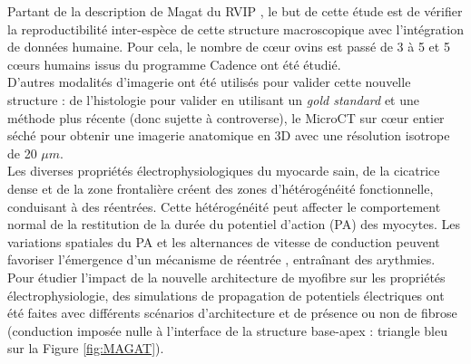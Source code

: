 Partant de la description de Magat du RVIP \cite{Magat2022},  le but de cette étude est de vérifier la reproductibilité inter-espèce de cette structure macroscopique avec l’intégration de données humaine. Pour cela, le nombre de cœur ovins est passé de 3 à 5 et 5 cœurs humains issus du programme Cadence ont été étudié. 
\\
D’autres modalités d’imagerie ont été utilisés pour valider cette nouvelle structure : de l’histologie pour valider en utilisant un \textit{gold standard} et une méthode plus récente (donc sujette à controverse), le MicroCT sur cœur entier séché \cite{Pallares_Lupon_2022} pour obtenir une imagerie anatomique en 3D avec une résolution isotrope de 20 $\mu m$.
\\
Les diverses propriétés électrophysiologiques du myocarde sain, de la cicatrice dense et de la zone frontalière créent des zones d'hétérogénéité fonctionnelle, conduisant à des réentrées. Cette hétérogénéité peut affecter le comportement normal de la restitution de la durée du potentiel d'action (PA) des myocytes. Les variations spatiales du PA et les alternances de vitesse de conduction peuvent favoriser l'émergence d'un mécanisme de réentrée \cite{MejaLopez2019}, entraînant des arythmies. Pour étudier l’impact de la nouvelle architecture de myofibre sur les propriétés électrophysiologie, des simulations de propagation de potentiels électriques ont été faites avec différents scénarios d’architecture et de présence ou non de fibrose (conduction imposée nulle à l’interface de la structure base-apex : triangle bleu sur la Figure \ref{fig:MAGAT}).

